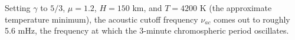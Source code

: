 Setting $\gamma$ to $5/3$, $\mu = 1.2$, $H = 150$ km,
and $ T = 4200 $ K (the approximate temperature minimum),
the acoustic cutoff frequency $\nu_{ac}$ comes out to roughly
5.6 mHz, the frequency at which the 3-minute chromospheric
period oscillates.





